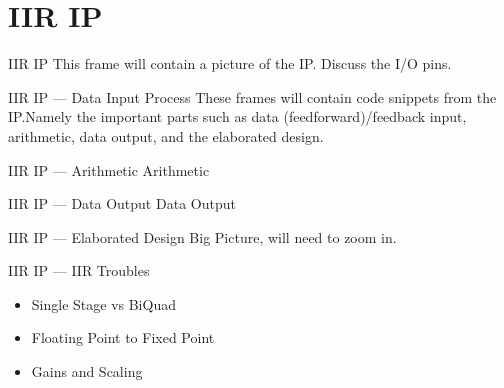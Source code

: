 \documentclass{beamer}
\begin{document}
\section{IIR IP}
\begin{frame}{IIR IP}
  This frame will contain a picture of the IP. Discuss the I/O pins.
\end{frame}
\begin{frame}{IIR IP --- Data Input Process }
  These frames will contain code snippets from the IP.\@ Namely the important
  parts such as data (feedforward)/feedback input, arithmetic, data output, and
  the elaborated design.
\end{frame}
\begin{frame}{IIR IP --- Arithmetic}
  Arithmetic
\end{frame}
\begin{frame}{IIR IP --- Data Output}
  Data Output
\end{frame}
\begin{frame}{IIR IP --- Elaborated Design }
  Big Picture, will need to zoom in.
\end{frame}
\begin{frame}{IIR IP --- IIR Troubles }
  \begin{itemize}[<+>]
  \item Single Stage vs BiQuad
  \item Floating Point to Fixed Point
  \item Gains and Scaling
  \end{itemize}
\end{frame}
\end{document}
